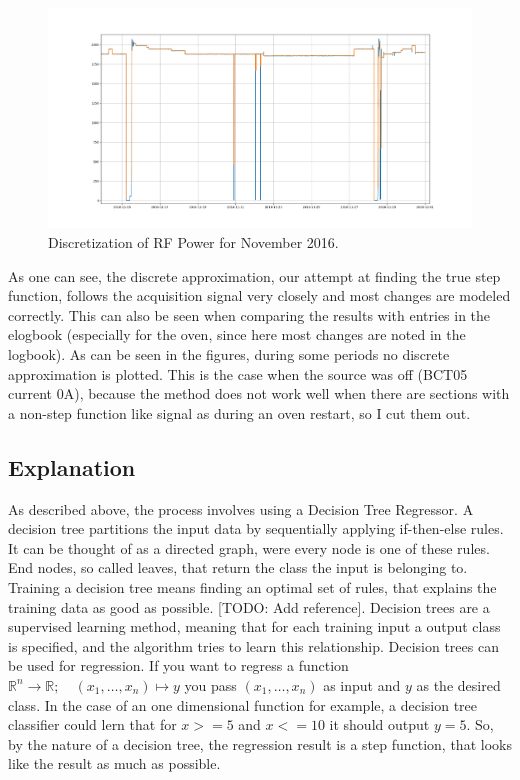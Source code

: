 \documentclass[12pt,a4paper]{article}
\begin{document}
\begin{figure}
\centering
\includegraphics{images/rf_discrete_nov2016.png}
\caption{Discretization of RF Power for November 2016.}
\end{figure}

As one can see, the discrete approximation, our attempt at finding the true step function, follows the acquisition signal very closely and most changes are modeled correctly. This can also be seen when comparing the results with entries in the elogbook (especially for the oven, since here most changes are noted in the logbook). As can be seen in the figures, during some periods no discrete approximation is plotted. This is the case when the source was off (BCT05 current 0A), because the method does not work well when there are sections with a non-step function like signal as during an oven restart, so I cut them out.

\hypertarget{explanation}{%
\subsection{Explanation}\label{explanation}}

As described above, the process involves using a Decision Tree Regressor. A decision tree partitions the input data by sequentially
applying if-then-else rules. It can be thought of as a directed graph, were every node is one of these rules. End nodes, so called leaves, that return the class the input is belonging to. Training a decision tree means finding an optimal set of rules, that explains the training data as good as possible. {[}TODO: Add reference{]}. Decision trees are a supervised learning method, meaning that for each training input a output class is specified, and the algorithm tries to learn this relationship. Decision trees can be used for regression. If you want to regress a function \(\mathbb R^n \to \mathbb R; \quad (x_1, \dots, x_n) \mapsto y\) you
pass \((x_1, \dots, x_n)\) as input and \(y\) as the desired class. In the case of an one dimensional function for example, a decision tree classifier could lern that for \(x>=5\) and \(x<=10\) it should output \(y=5\). So, by the nature of a decision tree, the regression result is a step function, that looks like the result as much as possible.
\end{document}
